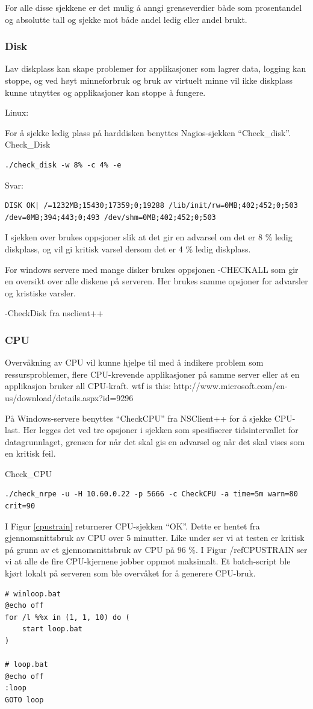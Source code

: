 For alle disse sjekkene er det mulig å anngi grenseverdier både som prosentandel og absolutte tall og sjekke mot både andel ledig eller andel brukt. 
\subsubsection{Disk}
Lav diskplass kan skape problemer for applikasjoner som lagrer data, logging kan stoppe, og ved høyt minneforbruk og bruk av virtuelt minne vil ikke diskplass kunne utnyttes og applikasjoner kan stoppe å fungere.

Linux:

For å sjekke ledig plass på harddisken benyttes Nagios-sjekken “Check\_disk”. 
Check\_Disk
\begin{lstlisting}
./check_disk -w 8% -c 4% -e
\end{lstlisting}
Svar: 
\begin{lstlisting}
DISK OK| /=1232MB;15430;17359;0;19288 /lib/init/rw=0MB;402;452;0;503 /dev=0MB;394;443;0;493 /dev/shm=0MB;402;452;0;503
\end{lstlisting}
I sjekken over brukes oppsjoner slik at det gir en advarsel om det er 8 \% ledig diskplass, og vil gi kritisk varsel dersom det er 4 \% ledig diskplass.

For windows servere med mange disker brukes oppsjonen -CHECKALL som gir en oversikt over alle diskene på serveren. Her brukes samme opsjoner for advarsler og kristiske varsler.

-CheckDisk fra nsclient++

\subsubsection{CPU}

Overvåkning av CPU vil kunne hjelpe til med å indikere problem som ressursproblemer, flere CPU-krevende applikasjoner på samme server eller at en applikasjon bruker all CPU-kraft.  
wtf is this: http://www.microsoft.com/en-us/download/details.aspx?id=9296


På Windows-servere benyttes “CheckCPU” fra NSClient++ for å sjekke CPU-last. Her legges det ved tre opsjoner i sjekken som spesifiserer tidsintervallet for datagrunnlaget, grensen for når det skal gis en advarsel og når det skal vises som en kritisk feil.

Check\_CPU
\begin{lstlisting}
./check_nrpe -u -H 10.60.0.22 -p 5666 -c CheckCPU -a time=5m warn=80 crit=90
\end{lstlisting}
I Figur \ref{cpustrain} returnerer CPU-sjekken “OK”. Dette er hentet fra gjennomsnittsbruk av CPU over 5 minutter. Like under ser vi at testen er kritisk på grunn av et gjennomsnittsbruk av CPU på 96 \%. I Figur /ref{CPUSTRAIN} ser vi at alle de fire CPU-kjernene jobber oppmot maksimalt. Et batch-script ble kjørt lokalt på serveren som ble overvåket for å generere CPU-bruk.
\begin{lstlisting}
# winloop.bat
@echo off
for /l %%x in (1, 1, 10) do (
    start loop.bat
)

# loop.bat
@echo off
:loop
GOTO loop
\end{lstlisting}

